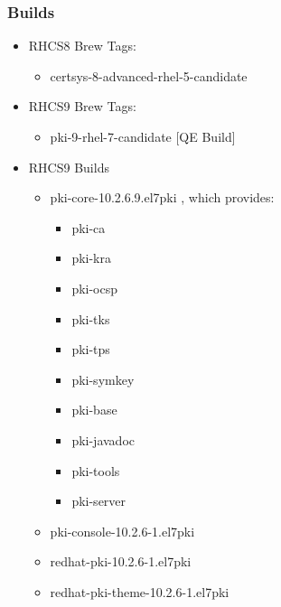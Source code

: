 \documentclass[a4paper]{article}
\begin{document}
    \subsubsection{Builds}
        \begin{itemize}
            \item RHCS8 Brew Tags:
                \begin{itemize}
                    \item certsys-8-advanced-rhel-5-candidate
                \end{itemize}
            \item RHCS9 Brew Tags:
                \begin{itemize}
                    \item pki-9-rhel-7-candidate [QE Build]
                \end{itemize}
            \item RHCS9 Builds
                \begin{itemize}
                    \item pki-core-10.2.6.9.el7pki , which provides:
                        \begin{itemize}
                            \item pki-ca
                            \item pki-kra
                            \item pki-ocsp
                            \item pki-tks
                            \item pki-tps
                            \item pki-symkey
                            \item pki-base
                            \item pki-javadoc
                            \item pki-tools
                            \item pki-server
                        \end{itemize}
                    \item pki-console-10.2.6-1.el7pki
                    \item redhat-pki-10.2.6-1.el7pki
                    \item redhat-pki-theme-10.2.6-1.el7pki
                \end{itemize}
        \end{itemize}
\end{document}

